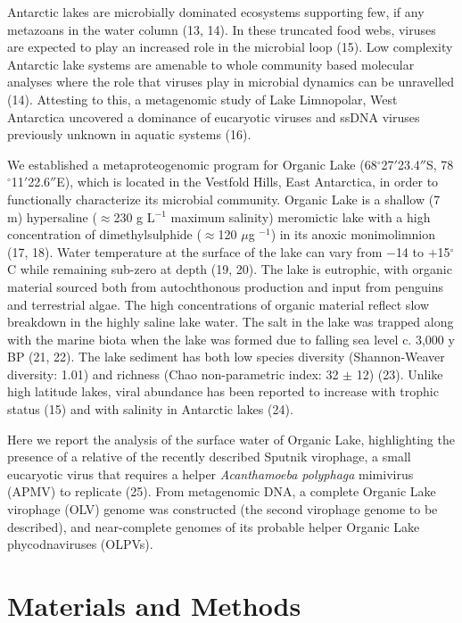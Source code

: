 Antarctic lakes are microbially dominated ecosystems supporting few, if any metazoans in the water column (13, 14). 
In these truncated food webs, viruses are expected to play an increased role in the microbial loop (15). 
Low complexity Antarctic lake systems are amenable to whole community based molecular analyses where the role that viruses play in microbial dynamics can be unravelled (14). 
Attesting to this, a metagenomic study of Lake Limnopolar, West Antarctica uncovered a dominance of eucaryotic viruses and ssDNA viruses previously unknown in aquatic systems (16). 

We established a metaproteogenomic program for Organic Lake (68$^{\circ}$27$'$23.4$''$S, 78$^{\circ}$11$'$22.6$''$E), which is located in the Vestfold Hills, East Antarctica, in order to functionally characterize its microbial community. 
Organic Lake is a shallow (7 m) hypersaline ($\approx$230 g L$^{-1}$ maximum salinity) meromictic lake with a high concentration of dimethylsulphide ($\approx$120 $\mu$g $^{-1}$) in its anoxic monimolimnion (17, 18). 
Water temperature at the surface of the lake can vary from $-$14 to $+$15$^{\circ}$C while remaining sub-zero at depth (19, 20). 
The lake is eutrophic, with organic material sourced both from autochthonous production and input from penguins and terrestrial algae. 
The high concentrations of organic material reflect slow breakdown in the highly saline lake water. 
The salt in the lake was trapped along with the marine biota when the lake was formed due to falling sea level c. 3,000 y BP (21, 22). The lake sediment has both low species diversity (Shannon-Weaver diversity: 1.01) and richness (Chao non-parametric index: 32 $\pm$ 12) (23). 
Unlike high latitude lakes, viral abundance has been reported to increase with trophic status (15) and with salinity in Antarctic lakes (24). 

Here we report the analysis of the surface water of Organic Lake, highlighting the presence of a relative of the recently described Sputnik virophage, a small eucaryotic virus that requires a helper \textit{Acanthamoeba polyphaga} mimivirus (APMV) to replicate (25). 
From metagenomic DNA, a complete Organic Lake virophage (OLV) genome was constructed (the second virophage genome to be described), and near-complete genomes of its probable helper Organic Lake phycodnaviruses (OLPVs).


\section{Materials and Methods}

